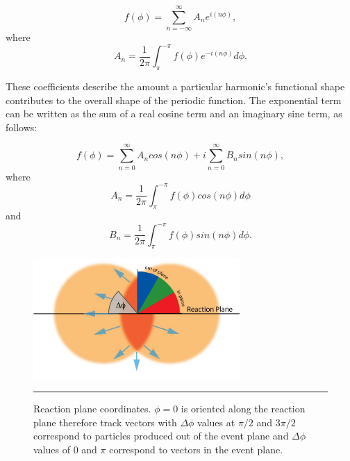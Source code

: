 \begin{equation}
f(\phi) = \sum^{\infty}_{n=-\infty} A_{n} e^{i(n \phi)},
\end{equation}
where
\begin{equation}
A_{n} = \frac{1}{2\pi} \int^{-\pi}_{\pi} f(\phi) e^{-i(n \phi)} d\phi.
\end{equation}

These coefficients describe the amount a particular harmonic's functional shape contributes to the overall shape of the periodic function. The exponential term can be written as the sum of a real cosine term and an imaginary sine term, as follows:

\begin{equation}
f(\phi) = \sum^{\infty}_{n=0} A_{n} cos ( n \phi) + i \sum^{\infty}_{n=0} B_{n} sin (n \phi),
\end{equation}
where
\begin{equation}
A_{n} = \frac{1}{2\pi} \int^{-\pi}_{\pi} f(\phi) cos (n \phi) d\phi
\end{equation}
and
\begin{equation}
B_{n} = \frac{1}{2\pi} \int^{-\pi}_{\pi} f(\phi) sin (n \phi) d\phi.
\end{equation}

\begin{figure}[htbp!]
  \centering
      \includegraphics[width=0.7\textwidth]{Figures/RP_InOutPlane_3.jpg}
          \rule{35em}{0.5pt}
  \caption[Reaction plane coordinates.]{Reaction plane coordinates. $\phi = 0$ is oriented along the reaction plane therefore track vectors with $\Delta\phi$ values at $\pi/2$ and $3 \pi / 2$ correspond to particles produced out of the event plane and $\Delta\phi$ values of $0$ and $\pi$ correspond to vectors in the event plane.}

  \label{fig:dphiep}
\end{figure}



